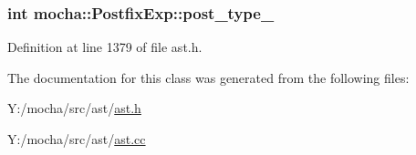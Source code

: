 \hypertarget{classmocha_1_1_postfix_exp_a66355b77ccb183ead3421a0a515f7993}{
\subsubsection[{post\_\-type\_\-}]{\setlength{\rightskip}{0pt plus 5cm}int {\bf mocha::PostfixExp::post\_\-type\_\-}}}
\label{classmocha_1_1_postfix_exp_a66355b77ccb183ead3421a0a515f7993}


Definition at line 1379 of file ast.h.



The documentation for this class was generated from the following files:\begin{DoxyCompactItemize}
\item 
Y:/mocha/src/ast/\hyperlink{ast_8h}{ast.h}\item 
Y:/mocha/src/ast/\hyperlink{ast_8cc}{ast.cc}\end{DoxyCompactItemize}
